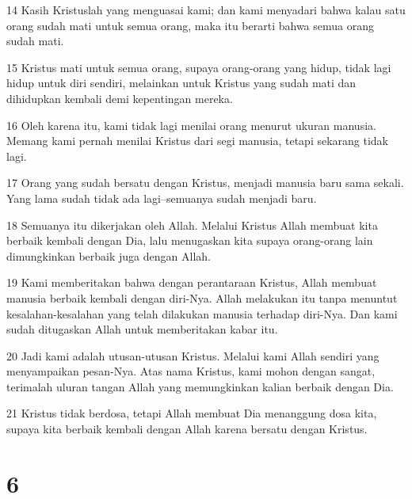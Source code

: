 \par 14 Kasih Kristuslah yang menguasai kami; dan kami menyadari bahwa kalau satu orang sudah mati untuk semua orang, maka itu berarti bahwa semua orang sudah mati.
\par 15 Kristus mati untuk semua orang, supaya orang-orang yang hidup, tidak lagi hidup untuk diri sendiri, melainkan untuk Kristus yang sudah mati dan dihidupkan kembali demi kepentingan mereka.
\par 16 Oleh karena itu, kami tidak lagi menilai orang menurut ukuran manusia. Memang kami pernah menilai Kristus dari segi manusia, tetapi sekarang tidak lagi.
\par 17 Orang yang sudah bersatu dengan Kristus, menjadi manusia baru sama sekali. Yang lama sudah tidak ada lagi--semuanya sudah menjadi baru.
\par 18 Semuanya itu dikerjakan oleh Allah. Melalui Kristus Allah membuat kita berbaik kembali dengan Dia, lalu menugaskan kita supaya orang-orang lain dimungkinkan berbaik juga dengan Allah.
\par 19 Kami memberitakan bahwa dengan perantaraan Kristus, Allah membuat manusia berbaik kembali dengan diri-Nya. Allah melakukan itu tanpa menuntut kesalahan-kesalahan yang telah dilakukan manusia terhadap diri-Nya. Dan kami sudah ditugaskan Allah untuk memberitakan kabar itu.
\par 20 Jadi kami adalah utusan-utusan Kristus. Melalui kami Allah sendiri yang menyampaikan pesan-Nya. Atas nama Kristus, kami mohon dengan sangat, terimalah uluran tangan Allah yang memungkinkan kalian berbaik dengan Dia.
\par 21 Kristus tidak berdosa, tetapi Allah membuat Dia menanggung dosa kita, supaya kita berbaik kembali dengan Allah karena bersatu dengan Kristus.

\chapter{6}

